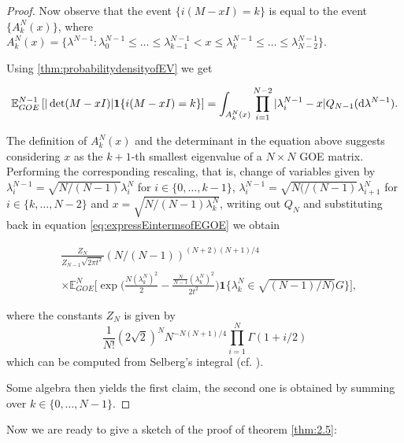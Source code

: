 \begin{proof}
Now observe that the event $\{i(M-xI)=k\}$ is equal to the event $\{A_k^N(x)\}$, where $A_k^N(x) = \{\lambda^{N-1}: \lambda_0^{N-1}\leq\dots\leq\lambda_{k-1}^{N-1}<x\leq\lambda_k^{N-1}\leq\dots\leq\lambda_{N-2}^{N-1}\}$.

Using \ref{thm:probabilitydensityofEV} we get

\begin{equation*}
	\mathbb E_{GOE}^{N-1}\left[|\det(M-xI)|\mathbf 1\{i(M-xI)=k\}\right]=\int_{A_k^N(x)}\prod_{i=1}^{N-2}|\lambda_i^{N-1}-x|Q_{N-1}(\mathop{}\!\mathrm{d}\lambda^{N-1}).
\end{equation*}

The definition of $A_k^N(x)$ and the determinant in the equation above suggests considering $x$ as the $k+1$-th smallest eigenvalue of a $N\times N$ GOE matrix. Performing the corresponding rescaling, that is, change of variables given by $\lambda_i^{N-1}=\sqrt{N/(N-1)}\lambda_i^N$ for $i\in\{0,\dots,k-1\}$, $\lambda_i^{N-1}=\sqrt{N(/(N-1)}\lambda_{i+1}^N$ for $i\in\{k,\dots,N-2\}$ and $x=\sqrt{N/(N-1)\lambda_k^N}$, writing out $Q_N$ and substituting back in equation \ref{eq:expressEintermsofEGOE} we obtain

\begin{align*}
	&\frac{Z_N}{Z_{N-1}\sqrt{2\pi t^2}}(N/(N-1))^{(N+2)(N+1)/4}\\
	&\times\mathbb E_{GOE}^N\Big[\exp\Big(\frac{N(\lambda_k^N)^2}{2}-\frac{\frac{N}{N-1}(\lambda_k^N)^2}{2t^2}\Big)\mathbf 1\{\lambda_k^N\in\sqrt{(N-1)/N)}G\}\Big],
\end{align*}

where the constants $Z_N$ is given by $$\frac{1}{N!}(2\sqrt 2)^N N^{-N(N+1)/4}\prod_{i=1}^N \Gamma(1+i/2)$$ which can be computed from Selberg's integral (cf. \cite{Mehta2004random}).

Some algebra then yields the first claim, the second one is obtained by summing over $k\in\{0,\dots,N-1\}$.

\end{proof}

Now we are ready to give a sketch of the proof of theorem \ref{thm:2.5}:


